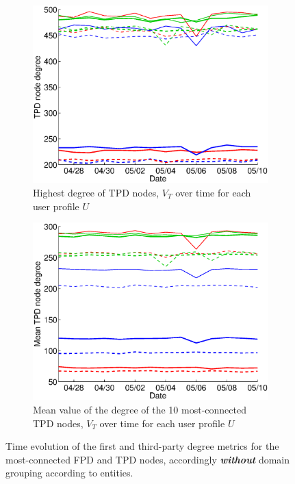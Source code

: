 \documentclass{sig-alternate}
\begin{document}
\begin{figure}
\begin{subfigure}{.38\textwidth}
  \end{subfigure} 
  \begin{subfigure}{.38\textwidth}
    \includegraphics[width=\textwidth]{figures/plots/third-mean-top1.eps}
    \caption{Highest degree of TPD nodes, $V_T$ over time for each user profile $U$}
    \label{fig:third_mean_top1_without_entities}
  \end{subfigure}
  \begin{subfigure}{.38\textwidth}
    \includegraphics[width=\textwidth]{figures/plots/third-mean-top10.eps}
    \caption{Mean value of the degree of the 10 most-connected TPD nodes, $V_T$ over time for each user profile $U$}
    \label{fig:third_mean_top10_without_entities}
  \end{subfigure}
  
  \caption{Time evolution of the first and third-party degree metrics for the most-connected FPD and TPD nodes, accordingly \textbf{\textit{without}} domain grouping according to entities.}
  \label{fig:highest_degree_nodes_without_entities}
  \end{figure}
  
\end{document}
